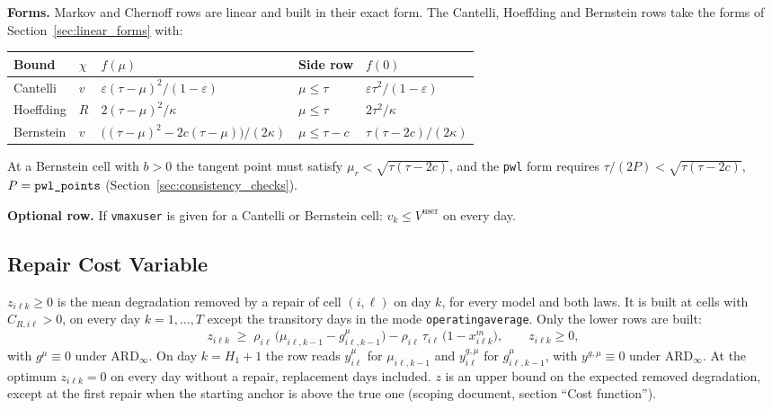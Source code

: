 \documentclass[11pt,a4paper]{article}
\theoremstyle{plain}
\theoremstyle{definition}
\newcommand{\ARDinf}{\mathrm{ARD}_{\infty}}
\renewcommand{\_}{\textunderscore\allowbreak{}}
\begin{document}
\textbf{Forms.} Markov and Chernoff rows are linear and built in their exact form.
The Cantelli, Hoeffding and Bernstein rows take the forms of
Section~\ref{sec:linear_forms} with:

\begingroup\small
\begin{longtable}{@{}lllll@{}}
\toprule
Bound & $\chi$ & $f(\mu)$ & Side row & $f(0)$ \\
\midrule
Cantelli & $v$ & $\varepsilon(\tau - \mu)^2/(1 - \varepsilon)$ & $\mu \leq \tau$
  & $\varepsilon\tau^2/(1-\varepsilon)$ \\
Hoeffding & $R$ & $2(\tau - \mu)^2/\kappa$ & $\mu \leq \tau$ & $2\tau^2/\kappa$ \\
Bernstein & $v$ & $\bigl((\tau - \mu)^2 - 2c(\tau - \mu)\bigr)/(2\kappa)$
  & $\mu \leq \tau - c$ & $\tau(\tau - 2c)/(2\kappa)$ \\
\bottomrule
\end{longtable}
\endgroup

At a Bernstein cell with $b > 0$ the tangent point must satisfy
$\mu_r < \sqrt{\tau(\tau - 2c)}$, and the \texttt{pwl} form requires
$\tau/(2P) < \sqrt{\tau(\tau - 2c)}$, $P = \texttt{pwl\_points}$
(Section~\ref{sec:consistency_checks}).

\textbf{Optional row.} If \texttt{v\_max\_user} is given for a Cantelli or
Bernstein cell: $v_k \leq V^{\mathrm{user}}$ on every day.

\subsection{Repair Cost Variable}
\label{sec:repair_cost}

$z_{i\ell k} \geq 0$ is the mean degradation removed by a repair of cell $(i,\ell)$ on
day $k$, for every model and both laws. It is built at cells with
$C_{R,i\ell} > 0$, on every day $k = 1, \ldots, T$ except the transitory days in the
mode \texttt{operating\_average}. Only the lower rows are built:
\begin{equation}
  z_{i\ell k} \;\geq\; \rho_{i\ell}\,\bigl(\mu_{i\ell,k-1} - g^{\mu}_{i\ell,k-1}\bigr)
    - \rho_{i\ell}\,\tau_{i\ell}\,\bigl(1 - x^m_{i\ell k}\bigr),
  \qquad z_{i\ell k} \geq 0,
  \label{eq:a_z}
\end{equation}
with $g^{\mu} \equiv 0$ under $\ARDinf$. On day $k = H_1 + 1$ the row reads
$y^{\mu}_{i\ell}$ for $\mu_{i\ell,k-1}$ and $y^{g,\mu}_{i\ell}$ for
$g^{\mu}_{i\ell,k-1}$, with $y^{g,\mu} \equiv 0$ under $\ARDinf$. At the optimum $z_{i\ell k} = 0$ on every day
without a repair, replacement days included. $z$ is an upper bound on the expected
removed degradation, except at the first repair when the starting anchor is above the
true one (scoping document, section ``Cost function'').
\end{document}
